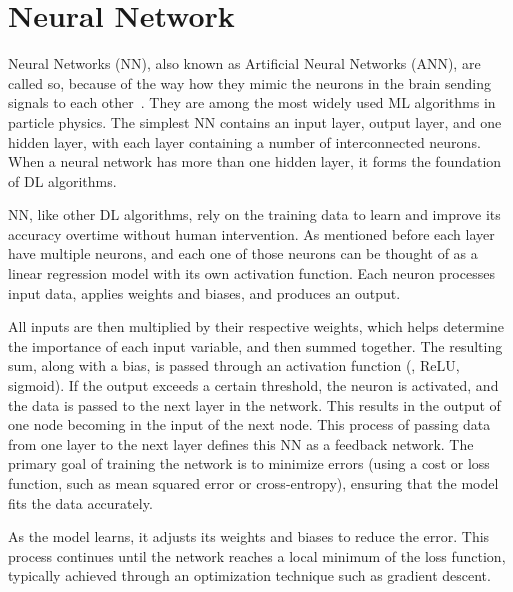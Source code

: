 \section{Neural Network}
Neural Networks (NN), also known as Artificial Neural Networks (ANN), are called so, because of the way how they mimic the neurons in the brain sending signals to each other~\cite{NN}.
They are among the most widely used ML algorithms in particle physics.
The simplest NN contains an input layer, output layer, and one hidden layer, with each layer containing a number of interconnected neurons. 
When a neural network has more than one hidden layer, it forms the foundation of DL algorithms.

NN, like other DL algorithms, rely on the training data to learn and improve its accuracy overtime without human intervention.
As mentioned before each layer have multiple neurons, and each one of those neurons
can be thought of as a linear regression model with its own activation function. Each neuron processes input data, applies weights and biases, and produces an output.

All inputs are then multiplied by their respective weights, which helps determine the importance of each input variable, and then summed together.
The resulting sum, along with a bias, is passed through an activation function (\eg{}, ReLU, sigmoid).
If the output exceeds a certain threshold, the neuron is activated, and the data is passed to the next layer in the network.
This results in the output of one node becoming in the input of the next node.
This process of passing data from one layer to the next layer defines this NN as a feedback network.
The primary goal of training the network is to minimize errors (using a cost or loss function, such as mean squared error or cross-entropy), ensuring that the model fits the data accurately.

As the model learns, it adjusts its weights and biases to reduce the error. This process continues until the network reaches a local minimum of the loss function, typically achieved through an optimization technique such as gradient descent.

